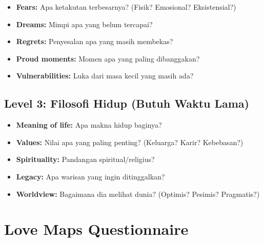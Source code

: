 \begin{praktikbox}
\begin{itemize}
    \item \textbf{Fears:} Apa ketakutan terbesarnya? (Fisik? Emosional? Eksistensial?)
    \item \textbf{Dreams:} Mimpi apa yang belum tercapai?
    \item \textbf{Regrets:} Penyesalan apa yang masih membekas?
    \item \textbf{Proud moments:} Momen apa yang paling dibanggakan?
    \item \textbf{Vulnerabilities:} Luka dari masa kecil yang masih ada?
\end{itemize}
\end{praktikbox}

\subsection{Level 3: Filosofi Hidup (Butuh Waktu Lama)}

\begin{itemize}
    \item \textbf{Meaning of life:} Apa makna hidup baginya?
    \item \textbf{Values:} Nilai apa yang paling penting? (Keluarga? Karir? Kebebasan?)
    \item \textbf{Spirituality:} Pandangan spiritual/religius?
    \item \textbf{Legacy:} Apa warisan yang ingin ditinggalkan?
    \item \textbf{Worldview:} Bagaimana dia melihat dunia? (Optimis? Pesimis? Pragmatis?)
\end{itemize}

\section{Love Maps Questionnaire}

